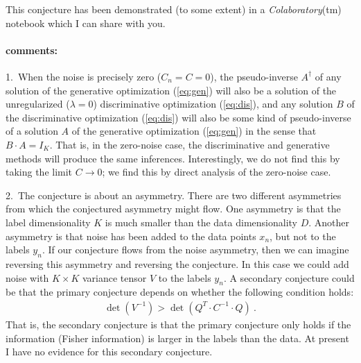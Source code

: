 \documentclass[12pt]{article}
\newcommand{\inv}{^{-1}}
\begin{document}
This conjecture has been demonstrated (to some extent) in a
\textsl{Colaboratory}(tm) notebook which I can share with you.

\paragraph{comments:}
1.~When the noise is precisely zero ($C_n=C= 0$), the pseudo-inverse
$A^\dagger$ of any solution of the generative optimization
(\ref{eq:gen}) will also be a solution of the unregularized ($\lambda = 0$) discriminative
optimization (\ref{eq:dis}), and any solution $B$ of the discriminative
optimization (\ref{eq:dis}) will also be some kind of pseudo-inverse of a
solution $A$ of the generative optimization (\ref{eq:gen}) in the sense
that $B\cdot A=I_K$.
That is, in the zero-noise case, the discriminative and generative
methods will produce the same inferences.
Interestingly, we do not find this by taking the limit $C\rightarrow
0$; we find this by direct analysis of the zero-noise case.

2.~The conjecture is about an asymmetry. There are two different
asymmetries from which the conjectured asymmetry might flow.
One asymmetry is that the label dimensionality $K$ is much smaller
than the data dimensionality $D$.
Another asymmetry is that noise has been added to the data points
$x_n$, but not to the labels $y_n$.
If our conjecture flows from the noise asymmetry, then we can imagine
reversing this asymmetry and reversing the conjecture.
In this case we could add noise with $K\times K$ variance tensor $V$ to the labels $y_n$.
A secondary conjecture could be that the primary conjecture depends on whether
the following condition holds:
\begin{align}
\det(V\inv) > \det(Q^T\cdot C\inv\cdot Q)
~.
\end{align}
That is, the secondary conjecture is that the primary conjecture only holds
if the information (Fisher information) is larger in the labels than the data.
At present I have no evidence for this secondary conjecture.
\end{document}
